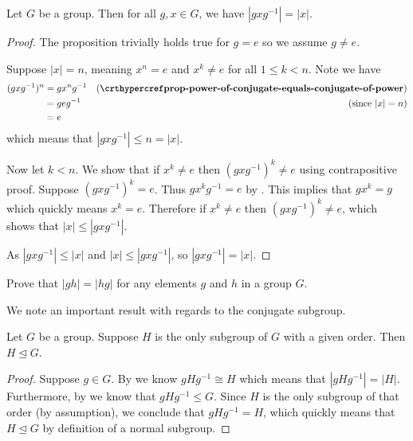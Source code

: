 \begin{proposition}\label{prop-order-of-conjugate-element-equals-order-of-element}
    Let $G$ be a group. Then for all $g, x \in G$, we have $|gxg^{-1}| = |x|$.
\end{proposition}
\begin{proof}
    The proposition trivially holds true for $g = e$ so we assume $g \neq e$.

    Suppose $|x| = n$, meaning $x^n = e$ and $x^k \neq e$ for all $1 \leq k < n$. Note we have
    \begin{align*}
        (gxg^{-1})^n  &= gx^ng^{-1} & (\myref{prop-power-of-conjugate-equals-conjugate-of-power})\\
        &= geg^{-1} & (\text{since } |x| = n)\\
        &= e
    \end{align*}
    which means that $|gxg^{-1}| \leq n = |x|$.

    Now let $k < n$. We show that if $x^k \neq e$ then $(gxg^{-1})^k \neq e$ using contrapositive proof. Suppose $(gxg^{-1})^k = e$. Thus $gx^kg^{-1} = e$ by . This implies that $gx^k = g$ which quickly means $x^k = e$. Therefore if $x^k \neq e$ then $(gxg^{-1})^k \neq e$, which shows that $|x| \leq |gxg^{-1}|$.

    As $|gxg^{-1}| \leq |x|$ and $|x| \leq |gxg^{-1}|$, so $|gxg^{-1}| = |x|$.
\end{proof}

\begin{exercise}
    Prove that $|gh| = |hg|$ for any elements $g$ and $h$ in a group $G$.
\end{exercise}

We note an important result with regards to the conjugate subgroup.
\begin{theorem}\label{thrm-unique-subgroup-of-given-order-is-normal}
    Let $G$ be a group. Suppose $H$ is the only subgroup of $G$ with a given order. Then $H \unlhd G$.
\end{theorem}
\begin{proof}
    Suppose $g \in G$. By  we know $gHg^{-1} \cong H$ which means that $|gHg^{-1}| = |H|$. Furthermore, by  we know that $gHg^{-1} \leq G$. Since $H$ is the only subgroup of that order (by assumption), we conclude that $gHg^{-1} = H$, which quickly means that $H \unlhd G$ by definition of a normal subgroup.
\end{proof}

